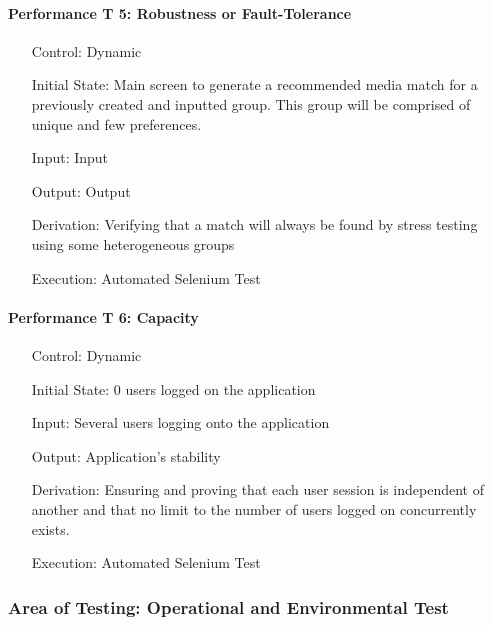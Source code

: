 \documentclass[12pt, titlepage]{article}
\begin{document}
\paragraph*{Performance T 5: Robustness or Fault-Tolerance}
\begin{itemize}
	\item[Control:] Dynamic
	\item[Initial State:] Main screen to generate a recommended media match for a previously created and inputted group. This group will be comprised of unique and few preferences.
	\item[Input:] Input
	\item[Output:] Output
	\item[Derivation:] Verifying that a match will always be found by stress testing using some heterogeneous groups
	\item[Execution:] Automated Selenium Test
\end{itemize}

\paragraph*{Performance T 6: Capacity}
\begin{itemize}
	\item[Control:] Dynamic
	\item[Initial State:] 0 users logged on the application
	\item[Input:] Several users logging onto the application
	\item[Output:] Application's stability
	\item[Derivation:] Ensuring and proving that each user session is independent of another and that no
	limit to the number of users logged on concurrently exists.
	\item[Execution:] Automated Selenium Test
\end{itemize}

\subsubsection{Area of Testing: Operational and Environmental Test}
\end{document}
